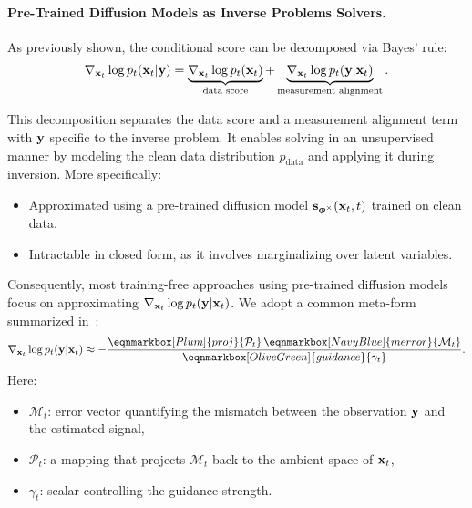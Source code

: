 \paragraph{Pre-Trained Diffusion Models as Inverse Problems Solvers.}
As previously shown, the conditional score can be decomposed via Bayes' rule:
\begin{align}
 \nabla_{{\mathbf{x}}_t} \log p_t({\mathbf{x}}_t | {\mathbf{y}}) = \underbrace{\nabla_{{\mathbf{x}}_t} \log p_t({\mathbf{x}}_t)}_{\text{data score}} + \underbrace{\nabla_{{\mathbf{x}}_t}\log p_t({\mathbf{y}} | {\mathbf{x}}_t)}_{\text{measurement alignment}}.
\label{eq:bayes_rule}
\end{align}

This decomposition separates the data score and a measurement alignment term with ${\mathbf{y}}$ specific to the inverse problem. It enables solving  in an unsupervised manner by modeling the clean data distribution $ p_{\text{data}} $ and applying it during inversion. More specifically:
\begin{itemize}
    \item {} Approximated using a pre-trained diffusion model ${\mathbf{s}}_{\bm{\phi}^\times}({\mathbf{x}}_t, t)$ trained on clean data.
    \item {} Intractable in closed form, as it involves marginalizing over latent variables.
\end{itemize}

Consequently, most training-free approaches using pre-trained diffusion models focus on approximating $\nabla_{{\mathbf{x}}_t} \log p_t({\mathbf{y}} | {\mathbf{x}}_t)$. We adopt a common meta-form summarized in~\citep{daras2024survey}:
\begin{equation*}
    \nabla_{\rvx_t} \log p_t(\rvy | \rvx_t) \approx - \frac{\eqnmarkbox[Plum]{proj}{\mathcal{P}_t}  \, \eqnmarkbox[NavyBlue]{merror}{    \mathcal{M}_t    }}{\eqnmarkbox[OliveGreen]{guidance}{  \gamma_t  }}.
\end{equation*}
Here:
\begin{itemize}
    \item $\mathcal{M}_t$: error vector quantifying the mismatch between the observation ${\mathbf{y}}$ and the estimated signal,
    \item $\mathcal{P}_t$: a mapping that projects $\mathcal{M}_t$ back to the ambient space of ${\mathbf{x}}_t$,
    \item $\gamma_t$: scalar controlling the guidance strength.
\end{itemize}

